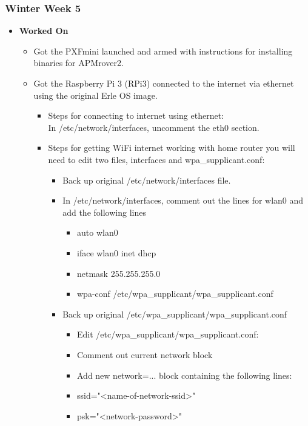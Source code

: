 \documentclass[compsoc,draftclsnofoot,onecolumn,10pt]{IEEEtran}
\begin{document}
\subsubsection{Winter Week 5}
\begin{itemize}
    \item {\textbf{\textbf{Worked On}}}
    \begin{itemize}
        \item Got the PXFmini launched and armed with instructions for installing binaries for APMrover2.
        \item Got the Raspberry Pi 3 (RPi3) connected to the internet via ethernet using the original Erle OS image.
        \begin{itemize}
            \item Steps for connecting to internet using ethernet:\\
            In /etc/network/interfaces, uncomment the eth0 section.
            \item Steps for getting WiFi internet working with home router you will need to edit two files, interfaces and wpa\_supplicant.conf:
            \begin{itemize}
                \item Back up original /etc/network/interfaces file.
                \item In /etc/network/interfaces, comment out the lines for wlan0 and add the following lines
                \begin{itemize}
                    \item auto wlan0
                    \item iface wlan0 inet dhcp
                    \item netmask 255.255.255.0
                    \item wpa-conf /etc/wpa\_supplicant/wpa\_supplicant.conf
                \end{itemize}
                \item Back up original /etc/wpa\_supplicant/wpa\_supplicant.conf
                \begin{itemize}
                    \item Edit /etc/wpa\_supplicant/wpa\_supplicant.conf:
                    \item Comment out current network block
                    \item Add new network={...} block containing the following lines:
                    \item ssid="<name-of-network-ssid>"
                    \item psk="<network-password>"
                \end{itemize}


\end{itemize}
\end{itemize}
\end{itemize}
\end{itemize}
\end{document}
